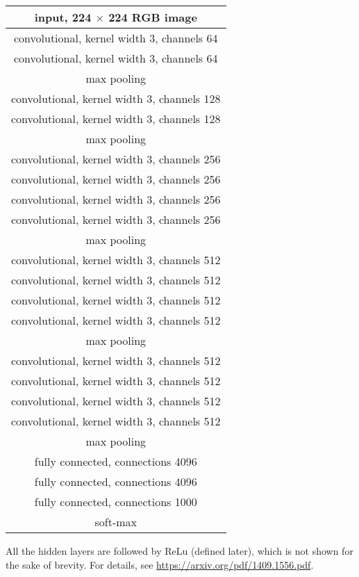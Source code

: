 \documentclass[]{article}
\begin{document}
\begin{center}
\begin{tabular}{|c|}
  \hline
  input, 224 $\times$ 224 RGB image\\
  \hline
  convolutional, kernel width 3, channels 64\\
  \hline
  convolutional, kernel width 3, channels 64\\
  \hline
  max pooling\\
  \hline
  convolutional, kernel width 3, channels 128\\
  \hline
  convolutional, kernel width 3, channels 128\\
  \hline
  max pooling\\
  \hline
  convolutional, kernel width 3, channels 256\\
  \hline
  convolutional, kernel width 3, channels 256\\
  \hline
  convolutional, kernel width 3, channels 256\\
  \hline
  convolutional, kernel width 3, channels 256\\
  \hline
  max pooling\\
  \hline
  convolutional, kernel width 3, channels 512\\
  \hline
  convolutional, kernel width 3, channels 512\\
  \hline
  convolutional, kernel width 3, channels 512\\
  \hline
  convolutional, kernel width 3, channels 512\\
  \hline
  max pooling\\
  \hline
  convolutional, kernel width 3, channels 512\\
  \hline
  convolutional, kernel width 3, channels 512\\
  \hline
  convolutional, kernel width 3, channels 512\\
  \hline
  convolutional, kernel width 3, channels 512\\
  \hline
  max pooling\\
  \hline
  fully connected, connections 4096\\
  \hline
  fully connected, connections 4096\\
  \hline
  fully connected, connections 1000\\
  \hline
  soft-max\\
  \hline
\end{tabular}
\end{center}
All the hidden layers are followed by ReLu (defined later),
which is not shown for the sake of brevity. For details, see
\url{https://arxiv.org/pdf/1409.1556.pdf}.
\end{document}
